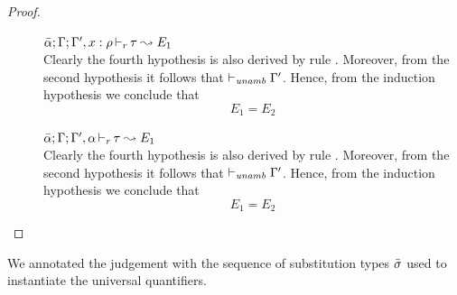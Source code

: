 \begin{proof}
\begin{description}
\item[]\quad$\bar{\alpha};\Gamma;\Gamma',x:\rho \mathop{\vdash_{r}} \tau \leadsto E_1$ \ \\
  Clearly the fourth hypothesis is also derived by rule .
  Moreover, from the second hypothesis it follows that $\vdash_{\mathit{unamb}} \Gamma'$.
  Hence, from the induction hypothesis we conclude that
\begin{equation*}
  E_1 = E_2
\end{equation*}

\item[]\quad$\bar{\alpha};\Gamma;\Gamma',\alpha \mathop{\vdash_{r}} \tau \leadsto E_1$ \ \\
  Clearly the fourth hypothesis is also derived by rule .
  Moreover, from the second hypothesis it follows that $\vdash_{\mathit{unamb}} \Gamma'$.
  Hence, from the induction hypothesis we conclude that
\begin{equation*}
  E_1 = E_2
\end{equation*}
\end{description}
\end{proof}

We annotated the judgement with the sequence of substitution types $\bar{\sigma}$
used to instantiate the universal quantifiers.

{\centering
{}}

